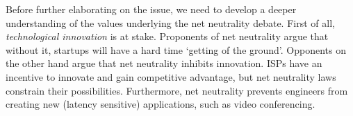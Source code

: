 
Before further elaborating on the issue, we need to develop a deeper understanding of the values underlying the net neutrality debate. First of all, \emph{technological innovation} is at stake. Proponents of net neutrality argue that without it, startups will have a hard time `getting of the ground'. Opponents on the other hand argue that net neutrality inhibits innovation. ISPs have an incentive to innovate and gain competitive advantage, but net neutrality laws constrain their possibilities. Furthermore, net neutrality prevents engineers from creating new (latency sensitive) applications, such as video conferencing.






